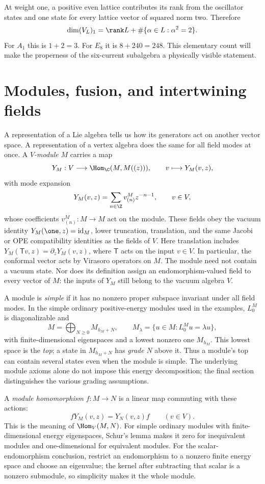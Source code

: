 At weight one, a positive even lattice contributes its rank from
the oscillator states and one state for every lattice vector
of squared norm two. Therefore
\begin{equation}
 \dim(V_L)_1=\rank L+\#\{\alpha\in L:\alpha^2=2\}.
 \label{eq:voa-weight1-lattice}
\end{equation}
For $A_1$ this is $1+2=3$. For $E_8$ it is $8+240=248$.
This elementary count will make the properness of the six-current
subalgebra a physically visible statement.

\section{Modules, fusion, and intertwining fields}

A representation of a Lie algebra tells us how its generators act on
another vector space. A representation of a vertex algebra does the
same for all field modes at once. A \emph{$V$-module} $M$ carries a map
\[
 Y_M:V\longrightarrow\Hom_{\C}(M,M((z))),\qquad
 v\longmapsto Y_M(v,z),
\]
with mode expansion
\[
 Y_M(v,z)=\sum_{n\in\Z}v^M_{(n)}z^{-n-1},\qquad v\in V,
\]
whose coefficients $v^M_{(n)}:M\to M$ act on the module.
These fields obey the vacuum identity
$Y_M(\one,z)=\mathrm{id}_M$, lower truncation, translation, and the
same Jacobi or OPE compatibility identities as the fields of $V$.
Here translation includes
$Y_M(\mathsf Tv,z)=\partial_zY_M(v,z)$, where $\mathsf T$
acts on the input $v\in V$.
In particular, the conformal vector acts by Virasoro operators on $M$.
The module need not contain a vacuum state. Nor does its definition
assign an endomorphism-valued field to every vector of $M$: the inputs
of $Y_M$ still belong to the vacuum algebra $V$.

A module is \emph{simple} if it has no nonzero proper subspace
invariant under all field modes. In the simple ordinary
positive-energy modules used in the examples, $L_0^M$ is diagonalizable
and
\[
 M=\bigoplus_{N\geq0}M_{h_M+N},\qquad
 M_\lambda=\{u\in M:L_0^Mu=\lambda u\},
\]
with finite-dimensional eigenspaces and a lowest nonzero one
$M_{h_M}$. This lowest space is the \emph{top}; a state in
$M_{h_M+N}$ has \emph{grade} $N$ above it. Thus a module's top
can contain several states even when the module is simple. The
underlying module axioms alone do not impose this energy decomposition;
the final section distinguishes the various grading assumptions.

A \emph{module homomorphism} $f:M\to N$ is a linear map commuting
with these actions:
\[
 fY_M(v,z)=Y_N(v,z)f\qquad(v\in V).
\]
This is the meaning of $\Hom_V(M,N)$. For simple ordinary modules
with finite-dimensional energy eigenspaces, Schur's lemma makes it
zero for inequivalent modules and one-dimensional for equivalent
modules. For the scalar-endomorphism conclusion, restrict an
endomorphism to a nonzero finite energy space and choose an eigenvalue;
the kernel after subtracting that scalar is a nonzero submodule,
so simplicity makes it the whole module.

